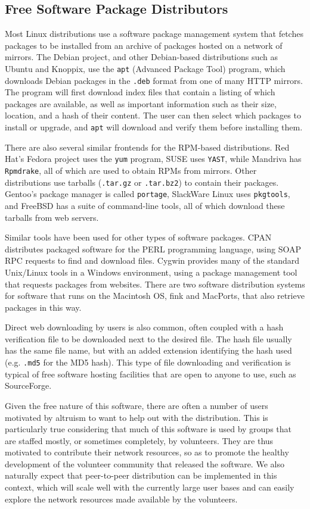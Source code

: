 \documentclass[conference]{IEEEtran}
\begin{document}
\subsection{Free Software Package Distributors}
\label{examples}

Most Linux distributions use a software package management system
that fetches packages to be installed from an archive of packages
hosted on a network of mirrors. The Debian project, and other
Debian-based distributions such as Ubuntu and Knoppix, use the
\texttt{apt} (Advanced Package Tool) program, which downloads Debian
packages in the \texttt{.deb} format from one of many HTTP mirrors.
The program will first download index files that contain a listing
of which packages are available, as well as important information
such as their size, location, and a hash of their content. The user
can then select which packages to install or upgrade, and
\texttt{apt} will download and verify them before installing them.

There are also several similar frontends for the RPM-based
distributions. Red Hat's Fedora project uses the \texttt{yum}
program, SUSE uses \texttt{YAST}, while Mandriva has
\texttt{Rpmdrake}, all of which are used to obtain RPMs from
mirrors. Other distributions use tarballs (\texttt{.tar.gz} or
\texttt{.tar.bz2}) to contain their packages. Gentoo's package
manager is called \texttt{portage}, SlackWare Linux uses
\texttt{pkgtools}, and FreeBSD has a suite of command-line tools,
all of which download these tarballs from web servers.

Similar tools have been used for other types of software packages. CPAN
distributes packaged software for the PERL
programming language, using SOAP RPC requests to find and download
files. Cygwin provides many of the
standard Unix/Linux tools in a Windows environment, using a
package management tool that requests packages from websites. There
are two software distribution systems for software that runs on the Macintosh OS, fink and
MacPorts, that also retrieve packages in this way.

Direct web downloading by users is also common, often coupled with a hash
verification file to be downloaded next to the desired
file. The hash file usually has the same file name, but with an
added extension identifying the hash used (e.g. \texttt{.md5} for
the MD5 hash). This type of file downloading and verification is
typical of free software hosting facilities that are open to anyone
to use, such as SourceForge.


Given the free nature of this software, there are often a number of users
motivated by altruism to want to help out with the distribution.
This is particularly true considering that much of this software is used by
groups that are staffed mostly, or sometimes completely, by
volunteers. They are thus motivated to contribute their network resources, so as to promote the healthy development
of the volunteer community that released the software.
We also naturally expect that peer-to-peer distribution can be implemented in
this context, which will scale well with the currently large user bases
and can easily explore the network resources made available by
the volunteers.
\end{document}
